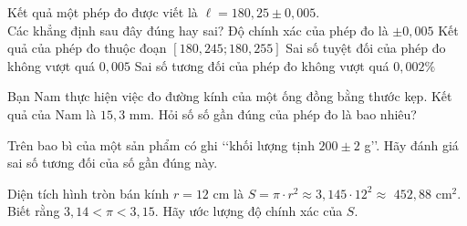 \begin{ex}%
	Kết quả một phép đo  được viết là $\ell= 180{,}25 \pm 0{,}005$. \\
	Các  khẳng định sau đây đúng hay sai?
	\choiceTF 
		{Độ chính xác  của phép đo là $\pm 0{,}005$}
		{\True Kết quả của phép đo thuộc đoạn $[180{,}245;  180{,}255]$}
		{\True Sai  số tuyệt đối của phép đo không vượt quá $0{,}005$}
		{Sai số tương đối của phép đo  không vượt quá $0{,}002\%$}
\end{ex}


\begin{bt}%
	Bạn Nam thực hiện việc  đo đường kính của một ống đồng bằng thước kẹp. Kết quả của Nam là $15{,}3$ mm. Hỏi số số gần đúng của phép đo là bao nhiêu?
\end{bt}

\begin{bt}%
	Trên bao bì của một sản phẩm có ghi \lq\lq khối lượng tịnh $200\pm 2$ g\rq\rq. Hãy đánh giá sai số tương đối của  số gần đúng này.
\end{bt}

\begin{bt}[H]%
Diện tích hình tròn bán kính $r = 12$ cm là $S = \pi \cdot r^2 \approx 3{,}145 \cdot 12^2 \approx$ $452{,}88$ cm$^2$. Biết rằng $3{,}14<\pi<3{,}15$. Hãy ước lượng độ chính xác của $S$.
\end{bt}

